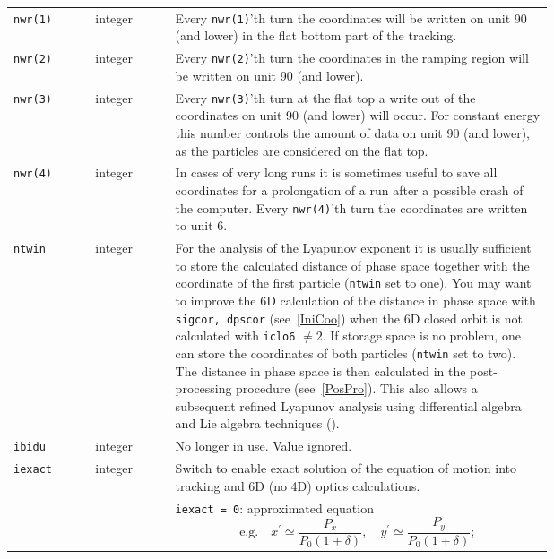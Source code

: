 \begin{longtabu}{@{}llp{0.7\linewidth}}
    \texttt{nwr(1)}        & integer  & Every \texttt{nwr(1)}'th turn the coordinates will be written on unit 90 (and lower) in the flat bottom part of the tracking. \\
    \texttt{nwr(2)}        & integer  & Every \texttt{nwr(2)}'th turn the coordinates in the ramping region will be written on unit 90 (and lower). \\
    \texttt{nwr(3)}        & integer  & Every \texttt{nwr(3)}'th turn at the flat top a write out of the coordinates on unit 90 (and lower) will occur. For constant energy this number controls the amount of data on unit 90 (and lower), as the particles are considered on the flat top. \\
    \texttt{nwr(4)}        & integer  & In cases of very long runs it is sometimes useful to save all coordinates for a prolongation of a run after a possible crash of the computer. Every \texttt{nwr(4)}'th turn the coordinates are written to unit 6. \\
    \texttt{ntwin}         & integer  & For the analysis of the Lyapunov exponent it is usually sufficient to store the calculated distance of phase space together with the coordinate of the first particle (\texttt{ntwin} set to one). You may want to improve the 6D calculation of the distance in phase space with \texttt{sigcor, dpscor} (see~\ref{IniCoo}) when the 6D closed orbit is not calculated with \texttt{iclo6} $\neq 2$. If storage space is no problem, one can store the coordinates of both particles (\texttt{ntwin} set to two). The distance in phase space is then calculated in the post-processing procedure (see~\ref{PosPro}). This also allows a subsequent refined Lyapunov analysis using differential algebra and Lie algebra techniques (\cite{Refine}). \\
    \texttt{ibidu}         & integer  & No longer in use. Value ignored. \\
    \texttt{iexact}        & integer  & Switch to enable exact solution of the equation of motion into tracking and 6D (no 4D) optics calculations. \\
                           &          & \texttt{iexact = 0}: approximated equation
                           \begin{equation*}
                                \mbox{e.g.}
                                \quad x^\prime \simeq \frac{P_x}{P_0(1+\delta)},
                                \quad y^\prime \simeq \frac{P_y}{P_0(1+\delta)};
                           \end{equation*} \\

\end{longtabu}

